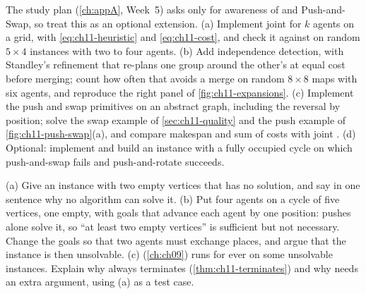 \begin{exercise}
\label{exr:ch11-coding}
The study plan (\cref{ch:appA}, Week~5) asks only for awareness of \mstar
and Push-and-Swap, so treat this as an optional extension. (a) Implement
joint \astar for $k$ agents on a grid, with \cref{eq:ch11-heuristic} and
\cref{eq:ch11-cost}, and check it against  on random
$5 \times 4$ instances with two to four agents. (b) Add independence
detection, with Standley's refinement that re-plans one group around the
other's at equal cost before merging; count how often that avoids a merge
on random $8 \times 8$ maps with six agents, and reproduce the right panel
of \cref{fig:ch11-expansions}. (c) Implement the push and swap primitives
on an abstract graph, including the reversal by position; solve the swap
example of \cref{sec:ch11-quality} and the push example of
\cref{fig:ch11-push-swap}(a), and compare makespan and sum of costs with
joint \astar. (d) Optional: implement  and build an instance
with a fully occupied cycle on which push-and-swap fails and
push-and-rotate succeeds.
\end{exercise}

\begin{exercise}[\difficulty{3}]
\label{exr:ch11-unsolvable}
(a) Give an instance with two empty vertices that has no solution, and say
in one sentence why no algorithm can solve it. (b) Put four agents on a
cycle of five vertices, one empty, with goals that advance each agent by
one position: pushes alone solve it, so ``at least two empty vertices'' is
sufficient but not necessary. Change the goals so that two agents must
exchange places, and argue that the instance is then unsolvable. (c) \cbs
(\cref{ch:ch09}) runs for ever on some unsolvable instances. Explain why
\mstar always terminates (\cref{thm:ch11-terminates}) and why \cbs needs an
extra argument, using (a) as a test case.
\end{exercise}
